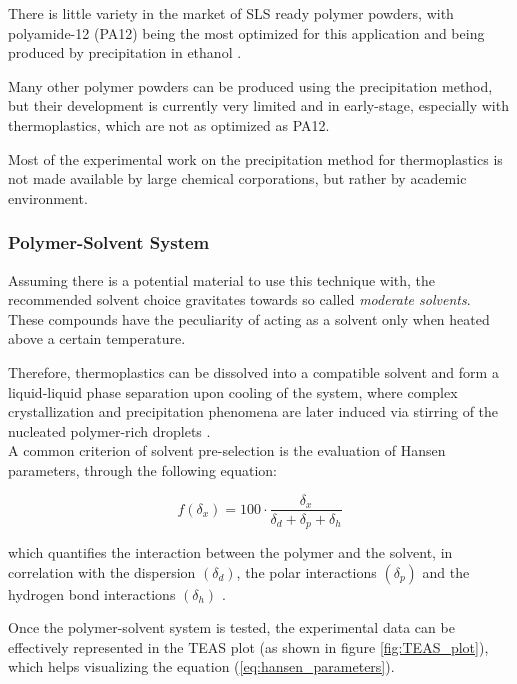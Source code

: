 \documentclass{article}
\begin{document}
    There is little variety in the market of SLS ready polymer powders, with polyamide-12 (PA12) being the most optimized for this 
    application and being produced by precipitation in ethanol \autocite*{DechetMaximilianA2020OtDo}.
    
    Many other polymer powders can be produced using the precipitation method, but their development is currently very limited 
    and in early-stage, especially with thermoplastics, which are not as optimized as PA12.
    
    Most of the experimental work on the precipitation method for thermoplastics is not made available by large chemical corporations, 
    but rather by academic environment. 

    \subsubsection{Polymer-Solvent System \label{polymer_solvent_system}}

    Assuming there is a potential material to use this technique with, the recommended solvent choice gravitates towards 
    so called \textit{moderate solvents}. \\
    
    These compounds have the peculiarity of acting as a solvent only when heated above a certain temperature. 

    Therefore, thermoplastics can be dissolved into a compatible solvent and form a liquid-liquid phase separation
    upon cooling of the system, where complex crystallization and precipitation phenomena are later induced via stirring of 
    the nucleated polymer-rich droplets \autocite*{DechetMaximilianA2020OtDo}.  \\ 

    A common criterion of solvent pre-selection is the evaluation of Hansen parameters, through the following equation: 

    \begin{equation}
        \textit{f} (\delta_x) = 100 \cdot \frac{\delta_x}{\delta_d + \delta_p + \delta_h}
        \label{eq:hansen_parameters}
    \end{equation}

    which quantifies the interaction between the polymer and the solvent, in correlation with the dispersion $(\delta_d)$, 
    the polar interactions $(\delta_p)$ and the hydrogen bond interactions $(\delta_h)$ \autocite*{DechetMaximilianA2020OtDo}. 

    Once the polymer-solvent system is tested, the experimental data can be effectively represented in the TEAS plot (as shown in figure \ref{fig:TEAS_plot}), which 
    helps visualizing the equation (\ref{eq:hansen_parameters}). 
\end{document}
